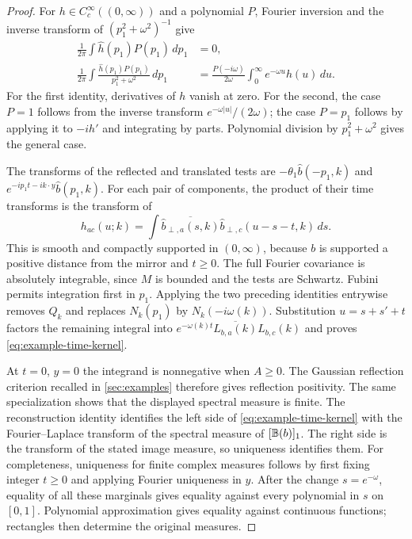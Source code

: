 \documentclass[11pt,letterpaper,reqno]{amsart}
\theoremstyle{definition}
\theoremstyle{remark}
\begin{document}
\begin{proof}
For $h\in C_c^\infty((0,\infty))$ and a polynomial $P$,
Fourier inversion and the inverse transform of
$(p_1^2+\omega^2)^{-1}$ give
\begin{align*}
 \frac1{2\pi}\int\widehat h(p_1)P(p_1)\,dp_1&=0,\\
 \frac1{2\pi}\int\frac{\widehat h(p_1)P(p_1)}{p_1^2+\omega^2}\,dp_1
 &=\frac{P(-i\omega)}{2\omega}
                   \int_0^\infty e^{-\omega u}h(u)\,du.
\end{align*}
For the first identity, derivatives of $h$ vanish at zero. For the
second, the case $P=1$ follows from the inverse transform
$e^{-\omega|u|}/(2\omega)$; the case $P=p_1$ follows by applying it
to $-ih'$ and integrating by parts. Polynomial division by
$p_1^2+\omega^2$ gives the general case.

The transforms of the reflected and translated tests are
$-\theta_1\widehat b(-p_1,k)$ and
$e^{-ip_1t-ik\cdot y}\widehat b(p_1,k)$. For each pair of components,
the product of their time transforms is the transform of
\[
 h_{ac}(u;k)=\int
       \overline{\widehat b_{\perp,a}(s,k)}
       \widehat b_{\perp,c}(u-s-t,k)\,ds.
\]
This is smooth and compactly supported in $(0,\infty)$, because
$b$ is supported a positive distance from the mirror and $t\ge0$.
The full Fourier covariance is absolutely integrable, since $M$ is
bounded and the tests are Schwartz. Fubini permits integration first
in $p_1$. Applying the two preceding identities entrywise removes
$Q_k$ and replaces $N_k(p_1)$ by $N_k(-i\omega(k))$. Substitution
$u=s+s'+t$ factors the remaining integral into
$e^{-\omega(k)t}\overline{L_{b,a}(k)}L_{b,c}(k)$ and proves
\eqref{eq:example-time-kernel}.

At $t=0$, $y=0$ the integrand is nonnegative when $A\ge0$.
The Gaussian reflection criterion recalled in \cref{sec:examples}
therefore gives reflection positivity. The same specialization
shows that the displayed spectral measure is finite. The
reconstruction identity identifies the left side of
\eqref{eq:example-time-kernel} with the Fourier--Laplace transform
of the spectral measure of $[\mathbb B(b)]_1$. The right side is the
transform of the stated image measure, so uniqueness identifies them.
For completeness, uniqueness for finite complex measures follows by
first fixing integer $t\ge0$ and applying Fourier uniqueness in $y$.
After the change $s=e^{-\omega}$, equality of all these marginals
gives equality against every polynomial in $s$ on $[0,1]$.
Polynomial approximation gives equality against continuous functions;
rectangles then determine the original measures.
\end{proof}
\end{document}

